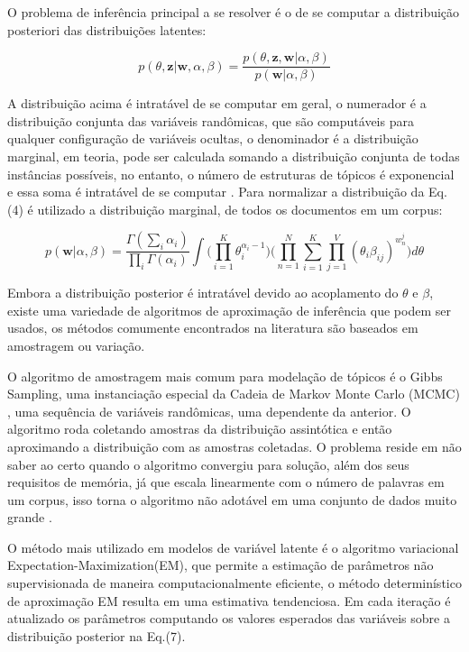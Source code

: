 \documentclass[12pt,a4paper]{article}
\begin{document}
O problema de inferência principal a se resolver é o de se computar a distribuição posteriori das distribuições latentes:

\begin{equation}
p(\theta,\textbf{z}|\textbf{w},\alpha,\beta) = \frac{p(\theta,\textbf{z},\textbf{w}|\alpha,\beta)}{p(\textbf{w}|\alpha,\beta)}
\end{equation}

A distribuição acima é intratável de se computar em geral, o numerador é a distribuição conjunta das variáveis randômicas, que são computáveis para qualquer configuração de variáveis ocultas,
 o denominador é a distribuição marginal, em teoria, pode ser calculada somando a distribuição conjunta de todas instâncias possíveis, no entanto,
 o número de estruturas de tópicos é exponencial e essa soma é intratável de se computar \cite{blei2012probabilistic}. Para normalizar a distribuição da Eq.(4) é utilizado a distribuição marginal,
 de todos os documentos em um corpus:

\begin{equation}
p(\textbf{w}|\alpha,\beta)=\frac{\Gamma(\sum_{i}\alpha_i)}{\prod_{i}\Gamma(\alpha_i)}\int{\Bigg(\prod_{i=1}^{K}\theta_i^{\alpha_i-1}\Bigg)} \Bigg(\prod_{n=1}^{N}\sum_{i=1}^{K}\prod_{j=1}^{V}(\theta_i\beta_{ij})^{w_n^j}\Bigg)d\theta
\end{equation}

Embora a distribuição posterior é intratável devido ao acoplamento do $\theta$ e $\beta$, existe uma variedade de algoritmos de aproximação de inferência que podem ser usados,
 os métodos comumente encontrados na literatura são baseados em amostragem ou variação.

O algoritmo de amostragem mais comum para modelação de tópicos é o Gibbs Sampling, uma instanciação especial da Cadeia de Markov Monte Carlo (MCMC) \cite{jordan1999introduction},
 uma sequência de variáveis randômicas, uma dependente da anterior. O algoritmo roda coletando amostras da distribuição assintótica e então aproximando a distribuição com as amostras coletadas.
 O problema reside em não saber ao certo  quando o algoritmo convergiu para solução, além dos seus requisitos de memória, já que escala linearmente com o número de palavras em um corpus,
 isso torna o algoritmo não adotável em uma conjunto de dados muito grande \cite{vrehuuvrek2011scalability}.

O método mais utilizado em modelos de variável latente é o algoritmo variacional Expectation-Maximization(EM), que permite a estimação de parâmetros não supervisionada de maneira computacionalmente eficiente,
 o método determinístico de aproximação EM resulta em uma estimativa tendenciosa. Em cada iteração é atualizado os parâmetros computando os valores esperados das variáveis sobre a distribuição posterior na Eq.(7).
\end{document}
